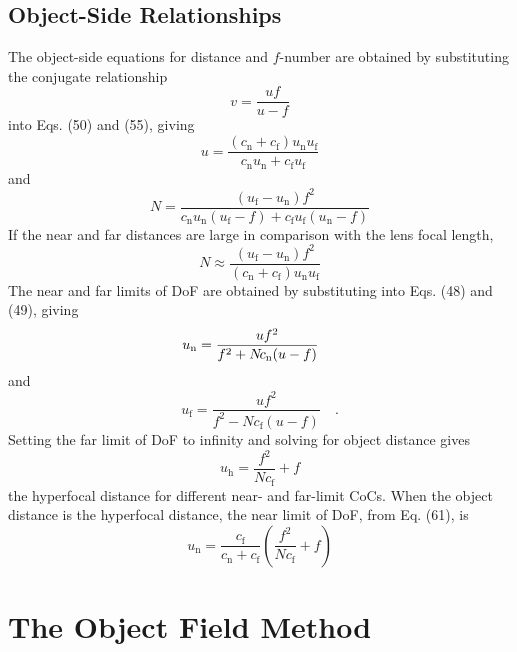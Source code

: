 \documentclass[11pt, oneside]{scrartcl}   	%
\begin{document}
\subsection{Object-Side Relationships}
\label{sec:object-side-relat}


The object-side equations for distance and $f$-number are obtained by
substituting the conjugate relationship
\begin{equation}
  \label{eq:57+++++}
  v=\frac{uf}{u-f}
\end{equation}
into Eqs. (50) and (55), giving
\begin{equation}
  \label{eq:58}
  u = \frac{(c_\mathrm{n}+c_\mathrm{f})u_\mathrm{n}u_\mathrm{f}}{c_\mathrm{n}u_\mathrm{n}+c_\mathrm{f}u_\mathrm{f}}
\end{equation}
and
\begin{equation}
  \label{eq:59}
  N=\frac{(u_\mathrm{f}-u_\mathrm{n})f^2}{c_\mathrm{n}u_\mathrm{n}(u_\mathrm{f}-f)+c_\mathrm{f}u_\mathrm{f}(u_\mathrm{n}-f)}
\end{equation}
If the near and far distances are large in comparison with the lens
focal length,
\begin{equation}
  \label{eq:1}
  N\approx\frac{(u_\mathrm{f}-u_\mathrm{n})f^2}{(c_\mathrm{n}+c_\mathrm{f})u_\mathrm{n}u_\mathrm{f}}
\end{equation}
The near and far limits of DoF are obtained by substituting  into
Eqs. (48) and (49), giving
\begin{equation}
  \label{eq:61}
  u_\mathrm{n}=\frac{uf^2}{f^2+N\!c_\mathrm{n}(u-f)}\hphantom{\quad.}
\end{equation}
and
\begin{equation}
  \label{eq:62}
  u_\mathrm{f}=\frac{uf^2}{f^2-N\!c_\mathrm{f}(u-f)}\quad.
\end{equation}
Setting the far limit of DoF to infinity and solving for object
distance gives
\begin{equation}
  \label{eq:uh}
  u_\mathrm{h}=\frac{f^2}{N\!c_\mathrm{f}}+f
\end{equation}
the hyperfocal distance for different near- and far-limit CoCs. When
the object distance is the hyperfocal distance, the near limit of DoF,
from Eq. (61), is
\begin{equation}
  \label{eq:un}
  u_\mathrm{n} = \frac{c_\mathrm{f}}{c_\mathrm{n}+c_\mathrm{f}}\left(\frac{f^2}{N\!c_\mathrm{f}}+f\right)
\end{equation}

\section{The Object Field Method}
\label{sec:object-field-method}
\end{document}
